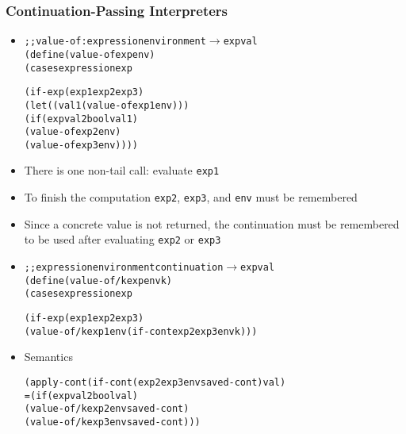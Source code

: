 \documentclass{beamer}
\newcommand{\arrow}{\(\rightarrow\)}
\begin{document}
\begin{frame}[fragile]
\frametitle{Continuation-Passing Interpreters}
\begin{scriptsize}
\begin{itemize}
\item<1->
\begin{alltt}
;; value-of : expression environment \arrow{} expval
(define (value-of exp env)
  (cases expression exp

    (if-exp (exp1 exp2 exp3)
            (let ((val1 (value-of exp1 env)))
              (if (expval2bool val1)
                  (value-of exp2 env)
                  (value-of exp3 env))))
\end{alltt}

\item<1-> There is one non-tail call: evaluate \texttt{exp1}

\item<1-> To finish the computation \texttt{exp2}, \texttt{exp3}, and \texttt{env} must be remembered

\item<1-> Since a concrete value is not returned, the continuation must be remembered to be used after evaluating \texttt{exp2} or \texttt{exp3}

\item<2->
\begin{alltt}
;; expression environment continuation \arrow{} expval
(define (value-of/k exp env k)
  (cases expression exp

    (if-exp (exp1 exp2 exp3)
            (value-of/k exp1 env (if-cont exp2 exp3 env k)))
\end{alltt}

\item<3-> Semantics
\begin{alltt}
  (apply-cont (if-cont (exp2 exp3 env saved-cont) val)
= (if (expval2bool val)
      (value-of/k exp2 env saved-cont)
      (value-of/k exp3 env saved-cont)))
\end{alltt}

\end{itemize}
\end{scriptsize}
\end{frame}
\end{document}

